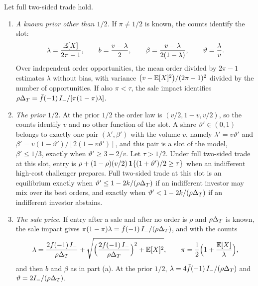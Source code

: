 \begin{proposition}\label{prop:informedshare}
Let full two-sided trade hold.
\begin{enumerate}[label=(\alph*),leftmargin=2em]
\item \emph{A known prior other than \(1/2\).} If \(\pi\ne1/2\) is known, the counts identify the slot:
\[
\lambda=\frac{\mathbb{E}[X]}{2\pi-1},\qquad b=\frac{v-\lambda}{2},\qquad \beta=\frac{v-\lambda}{2(1-\lambda)},\qquad
\vartheta=\frac{\lambda}{v}.
\]
Over independent order opportunities, the mean order divided by \(2\pi-1\) estimates \(\lambda\) without bias, with
variance \(\bigl(v-\mathbb{E}[X]^2\bigr)/(2\pi-1)^2\) divided by the number of opportunities. If also \(\pi<\tau\), the sale
impact identifies \(\rho\Delta_T=\bar f(-1)\,I_-/[\pi(1-\pi)\lambda]\).
\item \emph{The prior \(1/2\).} At the prior \(1/2\) the order law is \((v/2,1-v,v/2)\), so the counts identify \(v\) and
no other function of the slot. A share \(\vartheta'\in(0,1)\) belongs to exactly one pair \((\lambda',\beta')\) with
the volume \(v\), namely \(\lambda'=v\vartheta'\) and \(\beta'=v(1-\vartheta')/[2(1-v\vartheta')]\), and this pair is
a slot of the model, \(\beta'\le1/3\), exactly when \(\vartheta'\ge3-2/v\). Let \(\tau>1/2\). Under full two-sided
trade at this slot, entry is \(\rho+(1-\rho)(v/2)\,\mathbf{1}\{(1+\vartheta')/2\ge\tau\}\) when an indifferent high-cost
challenger prepares. Full two-sided trade at this slot is an equilibrium exactly when
\(\vartheta'\le1-2k/(\rho\Delta_T)\) if an indifferent investor may mix over its best orders, and exactly when
\(\vartheta'<1-2k/(\rho\Delta_T)\) if an indifferent investor abstains.
\item \emph{The sale price.} If entry after a sale and after no order is \(\rho\) and \(\rho\Delta_T\) is known, the sale
impact gives \(\pi(1-\pi)\lambda=\bar f(-1)\,I_-/(\rho\Delta_T)\), and with the counts
\[
\lambda=\frac{2\bar f(-1)\,I_-}{\rho\Delta_T}+\sqrt{\Bigl(\frac{2\bar f(-1)\,I_-}{\rho\Delta_T}\Bigr)^2+\mathbb{E}[X]^2},\qquad
\pi=\frac12\Bigl(1+\frac{\mathbb{E}[X]}{\lambda}\Bigr),
\]
and then \(b\) and \(\beta\) as in part (a). At the prior \(1/2\), \(\lambda=4\bar f(-1)\,I_-/(\rho\Delta_T)\) and
\(\vartheta=2I_-/(\rho\Delta_T)\).
\end{enumerate}
\end{proposition}


